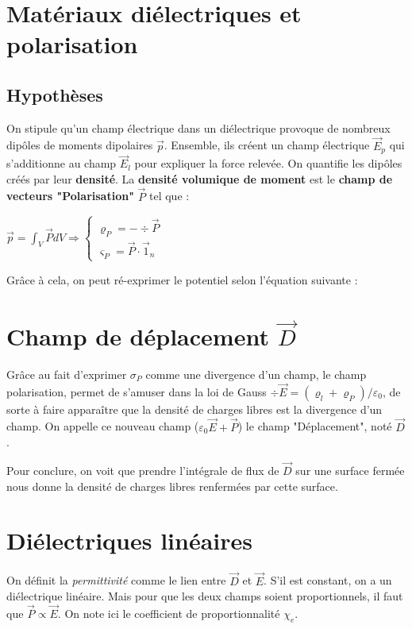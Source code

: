 \documentclass[12pt]{book}
\begin{document}
\section{Matériaux diélectriques et polarisation}
\subsection{Hypothèses}
On stipule qu'un champ électrique dans un diélectrique provoque de nombreux dipôles de moments dipolaires $\vec{p}$. Ensemble, ils créent un champ électrique $\vec{E}_p$ qui s'additionne au champ $\vec{E}_l$ pour expliquer la force relevée. On quantifie les dipôles créés par leur \textbf{densité}. La \textbf{densité volumique de moment} est le \textbf{champ de vecteurs "Polarisation"} $\vec{P}$ tel que :

\begin{center}
$\vec{p} = \int_V \vec{P} dV \Rightarrow \left\{ \begin{array}{l}
\varrho_P = -\div \vec{P} \\
\varsigma_P = \vec{P} \cdot \vec{1}_n
\end{array} \right.$
\end{center}

Grâce à cela, on peut ré-exprimer le potentiel selon l'équation suivante :



\section{Champ de déplacement $\vec{D}$}
Grâce au fait d'exprimer $\sigma_P$ comme une divergence d'un champ, le champ polarisation, permet de s'amuser dans la loi de Gauss $\div \vec{E} = (\varrho_l + \varrho_P)/\varepsilon_0$, de sorte à faire apparaître que la densité de charges libres est la divergence d'un champ. On appelle ce nouveau champ ($\varepsilon_0 \vec{E} + \vec{P}$) le champ "Déplacement", noté $\vec{D}$.

Pour conclure, on voit que prendre l'intégrale de flux de $\vec{D}$ sur une surface fermée nous donne la densité de charges libres renfermées par cette surface.
\section{Diélectriques linéaires}
On définit la \textit{permittivité} comme le lien entre $\vec{D}$ et $\vec{E}$. S'il est constant, on a un diélectrique linéaire. Mais pour que les deux champs soient proportionnels, il faut que $\vec{P} \propto \vec{E}$. On note ici le coefficient de proportionnalité $\chi_e$.
\end{document}
